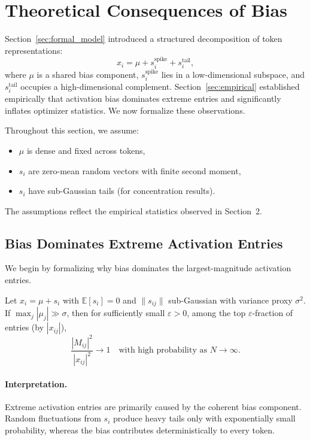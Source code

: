 \section{Theoretical Consequences of Bias}
\label{sec:theory}

Section~\ref{sec:formal_model} introduced a structured decomposition of token
representations:
\[
x_i = \mu + s_i^{\text{spike}} + s_i^{\text{tail}},
\]
where $\mu$ is a shared bias component, $s_i^{\text{spike}}$ lies in a
low-dimensional subspace, and $s_i^{\text{tail}}$ occupies a high-dimensional
complement.
Section~\ref{sec:empirical} established empirically that activation bias
dominates extreme entries and significantly inflates optimizer statistics.
We now formalize these observations.

Throughout this section, we assume:
\begin{itemize}
\item $\mu$ is dense and fixed across tokens,
\item $s_i$ are zero-mean random vectors with finite second moment,
\item $s_i$ have sub-Gaussian tails (for concentration results).
\end{itemize}

The assumptions reflect the empirical statistics observed in Section~2.

\subsection{Bias Dominates Extreme Activation Entries}
\label{subsec:theory_outliers}

We begin by formalizing why bias dominates the largest-magnitude activation
entries.

\begin{theorem}
\label{thm:bias_outlier}
Let $x_i = \mu + s_i$ with $\mathbb{E}[s_i]=0$ and
$\|s_{ij}\|$ sub-Gaussian with variance proxy $\sigma^2$.
If $\max_j |\mu_j| \gg \sigma$,
then for sufficiently small $\varepsilon>0$, among the top
$\varepsilon$-fraction of entries (by $|x_{ij}|$),
\[
\frac{|M_{ij}|^2}{|x_{ij}|^2} \to 1
\quad \text{with high probability as } N\to\infty.
\]
\end{theorem}

\paragraph{Interpretation.}
Extreme activation entries are primarily caused by the coherent bias component.
Random fluctuations from $s_i$ produce heavy tails only with exponentially small
probability, whereas the bias contributes deterministically to every token.

